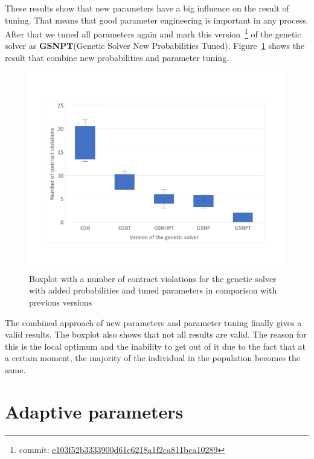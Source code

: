 These results show that new parameters have a big influence on the result of tuning. That means that good parameter engineering is important in any process.
After that we tuned all parameters again and mark this version~\footnote{commit: \href{https://git-st.inf.tu-dresden.de/mquat/mquat2/commit/e103f52b3333900d61c6218a1f2ca811bca10289}{e103f52b3333900d61c6218a1f2ca811bca10289}} of the genetic solver as \textbf{GSNPT}(Genetic Solver New Probabilities Tuned).
Figure~\ref{fig:boxplotsolverNewParametersTuning} shows the result that combine new probabilities and parameter tuning.

\begin{figure}
	\centering
	\includegraphics[width=\textwidth]{images/BoxPlotSolverNewParametersTuning.pdf}
	\caption[Boxplot with a number of contract violations for the genetic solver with added probabilities and tuned parameters in comparison with previous versions]{Boxplot with a number of contract violations for the genetic solver with added probabilities and tuned parameters in comparison with previous versions}
	\label{fig:boxplotsolverNewParametersTuning}
\end{figure}

The combined approach of new parameters and parameter tuning finally gives a valid results. The boxplot also shows that not all results are valid. The reason for this is the local optimum and the inability to get out of it due to the fact that at a certain moment, the majority of the individual in the population becomes the same. 

\section{Adaptive parameters}

